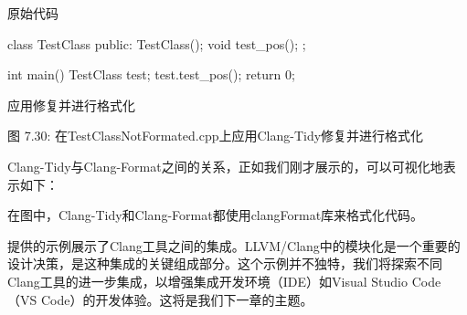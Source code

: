 原始代码

\begin{cpp}
class TestClass {
public:
  TestClass(){};
  void test_pos(){};
};

int main() {
  TestClass test;
  test.test_pos();
  return 0;
}
\end{cpp}

应用修复并进行格式化

\begin{center}
图 7.30: 在TestClassNotFormated.cpp上应用Clang-Tidy修复并进行格式化
\end{center}

Clang-Tidy与Clang-Format之间的关系，正如我们刚才展示的，可以可视化地表示如下：




在图中，Clang-Tidy和Clang-Format都使用clangFormat库来格式化代码。

提供的示例展示了Clang工具之间的集成。LLVM/Clang中的模块化是一个重要的设计决策，是这种集成的关键组成部分。这个示例并不独特，我们将探索不同Clang工具的进一步集成，以增强集成开发环境（IDE）如Visual Studio Code（VS Code）的开发体验。这将是我们下一章的主题。












































































